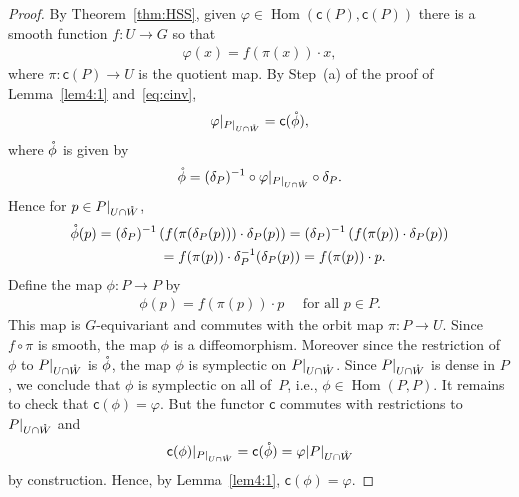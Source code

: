 \documentclass[10pt,a4paper]{amsart}
\numberwithin{equation}{section}
\begin{document}
\begin{proof}
  By Theorem~\ref{thm:HSS}, given $\varphi\in \operatorname{Hom}({\textsf{c}}(P),{\textsf{c}}(P))$ there
  is a smooth function $f\colon U\to G$ so that
\begin{gather*}
\varphi(x) = f(\pi(x))\cdot x,
\end{gather*}
where $\pi\colon {\textsf{c}}(P)\to U$ is the quotient map.  By Step~(a) of the proof
of Lemma~\ref{lem4:1} and~\eqref{eq:cinv},
\begin{gather*}
\varphi|_{P|_{U\cap {\mathaccent23{W}}}} = {\textsf{c}} ({\mathaccent23{\phi}}),
\end{gather*}
where ${\mathaccent23{\phi}}$ is given by
\begin{gather*}
{\mathaccent23{\phi}}= (\delta_P)^{-1} \circ \varphi|_{P|_{U\cap {\mathaccent23{W}}}} \circ \delta_P.
\end{gather*}
Hence for $p\in P|_{U\cap {\mathaccent23{W}}}$,
\begin{gather*}
{\mathaccent23{\phi}}(p) = (\delta_P)^{-1} \left(f (\pi(\delta_P (p)))\cdot
  \delta_P(p)\right)= (\delta_P)^{-1} \left(f(\pi(p))\cdot
  \delta_P(p)\right)\\
\hphantom{{\mathaccent23{\phi}}(p)}{}
= f(\pi(p))\cdot \delta_P^{-1} (\delta_P(p)) =
f(\pi(p))\cdot p.
\end{gather*}
Def\/ine the map $\phi\colon P\to P$ by
\begin{gather*}
\phi(p) = f(\pi(p))\cdot p\quad \textrm{ for all }p\in P.
\end{gather*}
This map is $G$-equivariant and commutes with the orbit map $\pi\colon P\to
U$.  Since $f \circ \pi$ is smooth, the map $\phi$ is a
dif\/feomorphism.  Moreover since the restriction of $\phi$ to $P|_{U\cap {\mathaccent23{W}}}$ is
${\mathaccent23{\phi}}$, the map $\phi$ is symplectic on $P|_{U\cap {\mathaccent23{W}}}$.  Since
$P|_{U\cap {\mathaccent23{W}}}$ is dense in $P$, we conclude that $\phi$ is symplectic
on all of~$P$, i.e., $\phi\in \operatorname{Hom}(P,P)$.  It remains to check that ${\textsf{c}}(\phi) =
\varphi$.  But the functor ${\textsf{c}}$ commutes with restrictions to
$P|_{U\cap {\mathaccent23{W}}}$ and
\begin{gather*}
{\textsf{c}}(\phi)|_{P|_{U\cap {\mathaccent23{W}}}} = {\textsf{c}}({\mathaccent23{\phi}}) = \varphi|{P|_{U\cap {\mathaccent23{W}}}}
\end{gather*}
by construction.  Hence, by Lemma~\ref{lem4:1}, ${\textsf{c}}(\phi) = \varphi$.
\end{proof}
\end{document}
